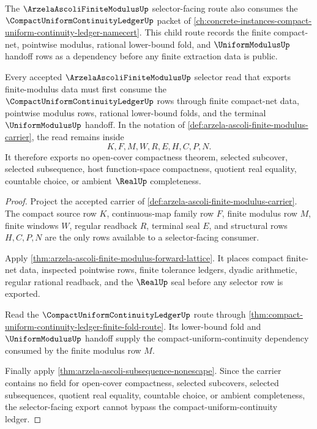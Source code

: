 The $\ArzelaAscoliFiniteModulusUp$ selector-facing route also consumes the $\CompactUniformContinuityLedgerUp$ packet of \autoref{ch:concrete-instances-compact-uniform-continuity-ledger-namecert}. This child route records the finite compact-net, pointwise modulus, rational lower-bound fold, and $\UniformModulusUp$ handoff rows as a dependency before any finite extraction data is public.

\begin{theorem}
\label{thm:arzela-ascoli-finite-modulus-compact-uniform-continuity-ledger-route}
Every accepted $\ArzelaAscoliFiniteModulusUp$ selector read that exports finite-modulus data must first consume the $\CompactUniformContinuityLedgerUp$ rows through finite compact-net data, pointwise modulus rows, rational lower-bound folds, and the terminal $\UniformModulusUp$ handoff. In the notation of \autoref{def:arzela-ascoli-finite-modulus-carrier}, the read remains inside
$$
K,F,M,W,R,E,H,C,P,N .
$$
It therefore exports no open-cover compactness theorem, selected subcover, selected subsequence, host function-space compactness, quotient real equality, countable choice, or ambient $\RealUp$ completeness.
\end{theorem}
\begin{proof}
Project the accepted carrier of \autoref{def:arzela-ascoli-finite-modulus-carrier}. The compact source row $K$, continuous-map family row $F$, finite modulus row $M$, finite windows $W$, regular readback $R$, terminal seal $E$, and structural rows $H,C,P,N$ are the only rows available to a selector-facing consumer.

Apply \autoref{thm:arzela-ascoli-finite-modulus-forward-lattice}. It places compact finite-net data, inspected pointwise rows, finite tolerance ledgers, dyadic arithmetic, regular rational readback, and the $\RealUp$ seal before any selector row is exported.

Read the $\CompactUniformContinuityLedgerUp$ route through \autoref{thm:compact-uniform-continuity-ledger-finite-fold-route}. Its lower-bound fold and $\UniformModulusUp$ handoff supply the compact-uniform-continuity dependency consumed by the finite modulus row $M$.

Finally apply \autoref{thm:arzela-ascoli-subsequence-nonescape}. Since the carrier contains no field for open-cover compactness, selected subcovers, selected subsequences, quotient real equality, countable choice, or ambient completeness, the selector-facing export cannot bypass the compact-uniform-continuity ledger.
\end{proof}
